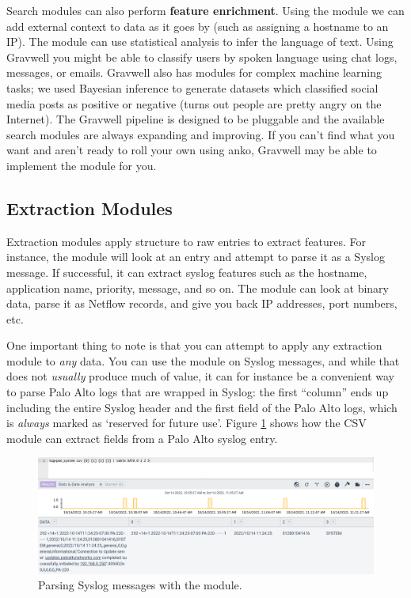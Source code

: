 Search modules can also perform \textbf{feature enrichment}. Using the
 module we can add external context to data as it goes by
(such as assigning a hostname to an IP). The  module can
use statistical analysis to infer the language of text. Using Gravwell
you might be able to classify users by spoken language using chat logs,
messages, or emails. Gravwell also has modules for complex machine
learning tasks; we used Bayesian inference to generate datasets which
classified social media posts as positive or negative (turns out people
are pretty angry on the Internet). The Gravwell pipeline is designed to
be pluggable and the available search modules are always expanding and
improving. If you can't find what you want and aren't ready to roll
your own using anko, Gravwell may be able to implement the module for you.

\subsection{Extraction Modules}

Extraction modules apply structure to raw entries to extract features. For instance, the  module will look at an entry and attempt to parse it as a Syslog message. If successful, it can extract syslog features such as the hostname, application name, priority, message, and so on. The  module can look at binary data, parse it as Netflow records, and give you back IP addresses, port numbers, etc.

One important thing to note is that you can attempt to apply any extraction module to \emph{any} data. You can use the  module on Syslog messages, and while that does not \emph{usually} produce much of value, it can for instance be a convenient way to parse Palo Alto logs that are wrapped in Syslog: the first ``column'' ends up including the entire Syslog header and the first field of the Palo Alto logs, which is \emph{always} marked as `reserved for future use'. Figure \ref{fig:pan-csv} shows how the CSV module can extract fields from a Palo Alto syslog entry.

\begin{figure}
	\includegraphics[width=0.9\linewidth]{images/pan-csv.png}
	\caption{Parsing Syslog messages with the  module.}
	\label{fig:pan-csv}
\end{figure}

